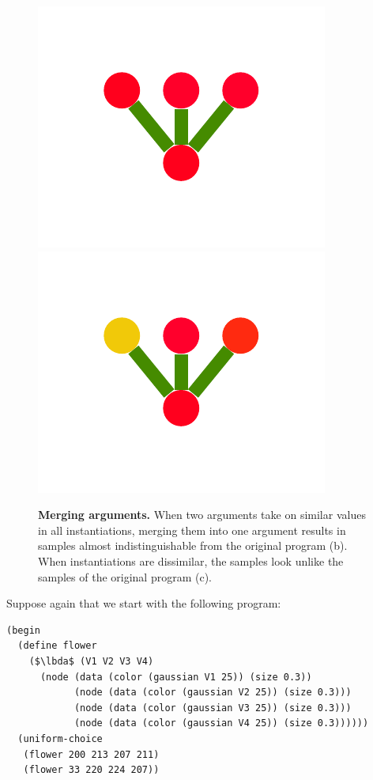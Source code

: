 \documentclass[a4paper,10pt]{article}
\newcommand{\lbda}{\color[rgb]{0,.3,.7} \lambda}
\begin{document}
\begin{figure}
{    \includegraphics[scale=.26]{./figures/4-2-2-mergeprog-bad-7.pdf}
    \includegraphics[scale=.26]{./figures/4-2-2-mergeprog-bad-8.pdf}
    \label{fig:merge-bad}        
    }
  \caption{{\bf Merging arguments.} When two arguments take on similar values in all instantiations, merging them into one argument results in samples almost indistinguishable from the original program (b). When instantiations are dissimilar, the samples look unlike the samples of the original program (c).}
\end{figure}


Suppose again that we start with the following program:
\begin{lstlisting}[mathescape=true]
(begin
  (define flower
    ($\lbda$ (V1 V2 V3 V4)
      (node (data (color (gaussian V1 25)) (size 0.3))
            (node (data (color (gaussian V2 25)) (size 0.3)))
            (node (data (color (gaussian V3 25)) (size 0.3)))
            (node (data (color (gaussian V4 25)) (size 0.3))))))
  (uniform-choice
   (flower 200 213 207 211)
   (flower 33 220 224 207))
\end{lstlisting}
\end{document}
